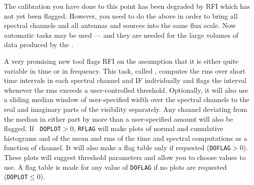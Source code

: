 
The calibration you have done to this point has been degraded by RFI
which has not yet been flagged.  However, you need to do the above in
order to bring all spectral channels and all antennas and sources into
the same flux scale.  Now automatic tasks may be used --- and they are
needed for the large volumes of data produced by the \@.

A very promising new tool flags RFI on the assumption that it is
either quite variable in time or in frequency.  This task, called
{\tt {}}, computes the rms over short time intervals in each
spectral channel and IF individually and flags the interval whenever
the rms exceeds a user-controlled threshold.  Optionally, it will also
use a sliding median window of user-specified width over the
spectral channels to the real and imaginary parts of the visibility
separately.  Any channel deviating from the median in either part by
more than a user-specified amount will also be flagged.  If {\tt
DOPLOT}$> 0$, {\tt RFLAG} will make plots of normal and cumulative
histograms and of the mean and rms of the time and spectral
computations as a function of channel.  It will also make a flag table
only if requested ({\tt DOFLAG}$ > 0$).  These plots will suggest
threshold parameters and allow you to choose values to use.  A flag
table is made for any value of {\tt DOFLAG} if no plots are requested
({\tt DOPLOT}$\leq 0$).

